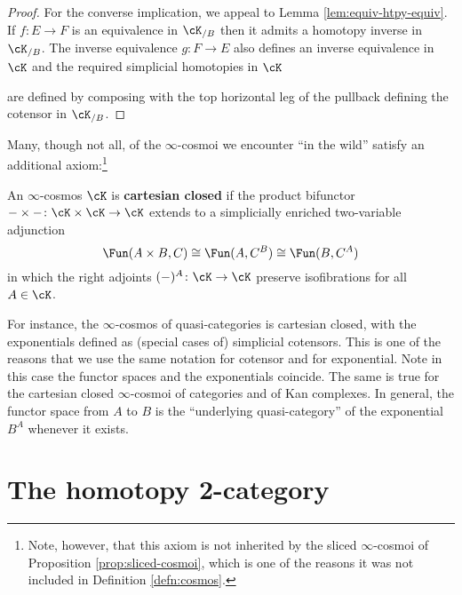 \begin{proof}
For the converse implication, we appeal to  Lemma \ref{lem:equiv-htpy-equiv}. If $f \colon E \to F$ is an equivalence in $\cK_{/B}$ then it admits a homotopy inverse in $\cK_{/B}$. The inverse equivalence $g \colon F \to E$ also defines an inverse equivalence in $\cK$ and the required simplicial homotopies in $\cK$
\begin{center}
\end{center}
are defined by composing with the top horizontal leg of the pullback defining the cotensor in $\cK_{/B}$.
\end{proof}

Many, though not all, of the $\infty$-cosmoi we encounter ``in the wild'' satisfy an additional axiom:\footnote{Note, however, that this axiom is not inherited by the sliced $\infty$-cosmoi of Proposition \ref{prop:sliced-cosmoi}, which is one of the reasons it was not included in Definition \ref{defn:cosmos}.}

\begin{definition}\label{defn:closed-cosmos}
   An $\infty$-cosmos $\cK$ is \textbf{cartesian closed} if the product bifunctor
$- \times -\colon \cK \times \cK \to \cK$ extends to a simplicially enriched two-variable adjunction
\[ \Fun(A \times B,C) \cong \Fun(A,C^B) \cong \Fun(B,C^A)\]
in which the right adjoints $(-)^A \colon \cK \to \cK$ preserve isofibrations for all $A \in \cK$.
\end{definition}

For instance, the $\infty$-cosmos of quasi-categories is cartesian closed, with the exponentials defined as (special cases of) simplicial cotensors. This is one of the reasons that we use the same notation for cotensor and for exponential. Note in this case the functor spaces and the exponentials coincide. The same is true for the cartesian closed $\infty$-cosmoi of categories and of Kan complexes. In general, the functor space from $A$ to $B$ is the ``underlying quasi-category'' of the exponential $B^A$ whenever it exists. %


\section{The homotopy 2-category}\label{sec:htpy-2-cat}

